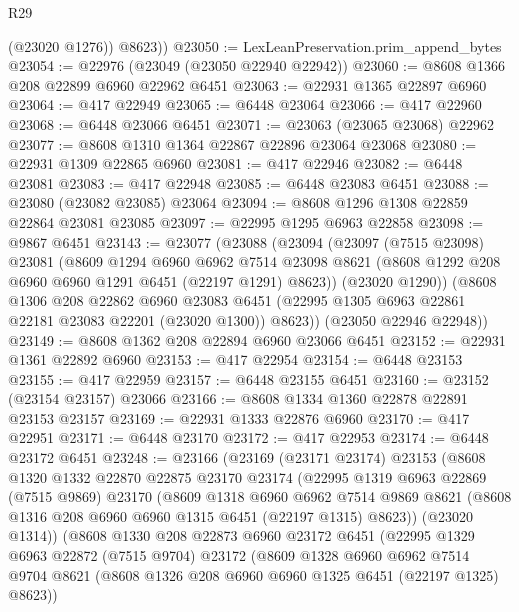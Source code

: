 \begin{lexlean}{R29}
\begin{coremodule}
          (@23020 @1276))
        @8623))
@23050 := LexLeanPreservation.prim_append_bytes
@23054 := @22976 (@23049 (@23050 @22940 @22942))
@23060 := @8608 @1366 @208 @22899 @6960 @22962 @6451
@23063 := @22931 @1365 @22897 @6960
@23064 := @417 @22949
@23065 := @6448 @23064
@23066 := @417 @22960
@23068 := @6448 @23066 @6451
@23071 := @23063 (@23065 @23068) @22962
@23077 := @8608 @1310 @1364 @22867 @22896 @23064 @23068
@23080 := @22931 @1309 @22865 @6960
@23081 := @417 @22946
@23082 := @6448 @23081
@23083 := @417 @22948
@23085 := @6448 @23083 @6451
@23088 := @23080 (@23082 @23085) @23064
@23094 := @8608 @1296 @1308 @22859 @22864 @23081 @23085
@23097 := @22995 @1295 @6963 @22858
@23098 := @9867 @6451
@23143 := @23077
    (@23088
      (@23094
        (@23097
          (@7515 @23098)
          @23081
          (@8609
            @1294
            @6960
            @6962
            @7514
            @23098
            @8621
            (@8608 @1292 @208 @6960 @6960 @1291 @6451 (@22197 @1291) @8623))
          (@23020 @1290))
        (@8608
          @1306
          @208
          @22862
          @6960
          @23083
          @6451
          (@22995 @1305 @6963 @22861 @22181 @23083 @22201 (@23020 @1300))
          @8623))
      (@23050 @22946 @22948))
@23149 := @8608 @1362 @208 @22894 @6960 @23066 @6451
@23152 := @22931 @1361 @22892 @6960
@23153 := @417 @22954
@23154 := @6448 @23153
@23155 := @417 @22959
@23157 := @6448 @23155 @6451
@23160 := @23152 (@23154 @23157) @23066
@23166 := @8608 @1334 @1360 @22878 @22891 @23153 @23157
@23169 := @22931 @1333 @22876 @6960
@23170 := @417 @22951
@23171 := @6448 @23170
@23172 := @417 @22953
@23174 := @6448 @23172 @6451
@23248 := @23166
    (@23169
      (@23171 @23174)
      @23153
      (@8608
        @1320
        @1332
        @22870
        @22875
        @23170
        @23174
        (@22995
          @1319
          @6963
          @22869
          (@7515 @9869)
          @23170
          (@8609
            @1318
            @6960
            @6962
            @7514
            @9869
            @8621
            (@8608 @1316 @208 @6960 @6960 @1315 @6451 (@22197 @1315) @8623))
          (@23020 @1314))
        (@8608
          @1330
          @208
          @22873
          @6960
          @23172
          @6451
          (@22995
            @1329
            @6963
            @22872
            (@7515 @9704)
            @23172
            (@8609
              @1328
              @6960
              @6962
              @7514
              @9704
              @8621
              (@8608 @1326 @208 @6960 @6960 @1325 @6451 (@22197 @1325) @8623))

\end{coremodule}
\end{lexlean}
